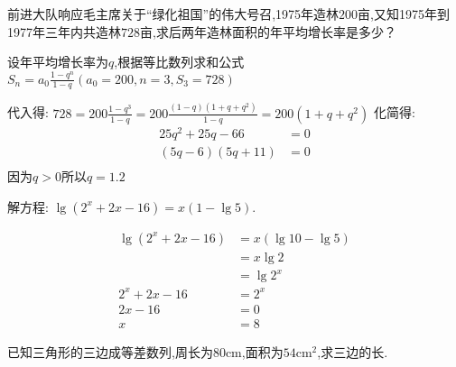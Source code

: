 \documentclass[answers]{exam}
\begin{document}
\begin{questions}
\begin{solution}
	\end{solution}
	\question
	前进大队响应毛主席关于\enquote{绿化祖国}的伟大号召,1975年造林$200$亩,又知1975年到1977年三年内共造林$728$亩,求后两年造林面积的年平均增长率是多少？
	\begin{solution}
		设年平均增长率为$q$,根据等比数列求和公式
		\begin{math}
			S_n = a_0\frac{1-q^n}{1-q} (a_0 = 200, n = 3, S_3 = 728)
		\end{math}

		代入得:
		\begin{math}
			728 = 200 \frac{1-q^3}{1-q} = 200 \frac{(1-q)(1 + q + q^2)}{1-q} = 200(1 + q + q^2)
		\end{math}
		化简得:
		\begin{align*}
			25q^2 + 25q - 66  & = 0 \\
			(5q - 6)(5q + 11) & = 0 \\
		\end{align*}
		因为$q > 0$所以$q=1.2$
	\end{solution}

	\question 解方程:
	\begin{math}
		\lg(2^x + 2x - 16) = x(1-\lg5)
	\end{math}.
	\begin{solution}
		\begin{align*}
			\lg(2^x + 2x - 16) & = x(\lg10 - \lg5) \\
			                   & = x\lg2           \\
			                   & = \lg2^x          \\
			2^x + 2x - 16      & = 2^x             \\
			2x - 16            & = 0               \\
			x                  & = 8
		\end{align*}
	\end{solution}

	\question 已知三角形的三边成等差数列,周长为$80$cm,面积为$54$cm$^2$,求三边的长.
	\begin{solution}



\end{solution}
\end{questions}
\end{document}
